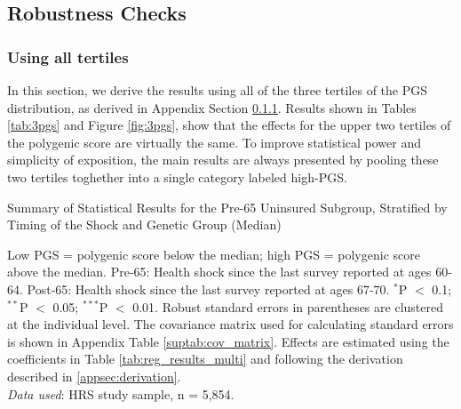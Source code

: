 \subsection{Robustness Checks}
\label{supsec:robustness}

\subsubsection{Using all tertiles} \label{appsec:3pgs}

In this section, we derive the results using all of the three tertiles of the PGS distribution, as derived in Appendix Section \ref{appsec:3pgs}.
Results shown in Tables \ref{tab:3pgs} and Figure \ref{fig:3pgs}, show that the effects for the upper two tertiles of the polygenic score are virtually the same.
To improve statistical power and simplicity of exposition, the main results are always presented by pooling these two tertiles toghether into a single category labeled high-PGS.

\begin{table}[!ht]
	\caption{Summary of Statistical Results for the Pre-65 Uninsured Subgroup, Stratified by Timing of the Shock and Genetic Group (Median)}
	\label{tab:3pgs}
	
		\begin{flushleft}
			Low PGS = polygenic score below the median; high PGS = polygenic score above the median.
			Pre-65: Health shock since the last survey reported at ages 60-64.
			Post-65: Health shock since the last survey reported at ages 67-70.
			$^{*}$P $<$ 0.1; $^{**}$P $<$ 0.05; $^{***}$P $<$ 0.01. Robust standard errors in parentheses are clustered at the individual level.
			The covariance matrix used for calculating standard errors is shown in Appendix Table \ref{suptab:cov_matrix}.
			Effects are estimated using the coefficients in Table \ref{tab:reg_results_multi} and following the derivation described in \ref{appsec:derivation}.\\
			\textit{Data used}: HRS study sample, n = 5,854.
		\end{flushleft}
\end{table}


